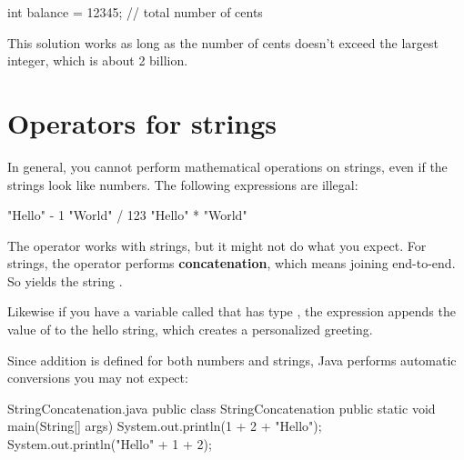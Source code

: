 \begin{code}
int balance = 12345;      // total number of cents
\end{code}


This solution works as long as the number of cents doesn't exceed the largest integer, which is about 2 billion.


\section{Operators for strings}


In general, you cannot perform mathematical operations on strings, even if the strings look like numbers.
The following expressions are illegal:

\begin{code}
"Hello" - 1     "World" / 123     "Hello" * "World"
\end{code}


The \java{+} operator works with strings, but it might not do what you expect.
For strings, the \java{+} operator performs {\bf concatenation}, which means joining end-to-end.
So  yields the string .

Likewise if you have a variable called  that has type , the expression  appends the value of  to the hello string, which creates a personalized greeting.

Since addition is defined for both numbers and strings, Java performs automatic conversions you may not expect:

\begin{trinket}[195]{StringConcatenation.java}
public class StringConcatenation {
    public static void main(String[] args) {
       System.out.println(1 + 2 + "Hello");
       System.out.println("Hello" + 1 + 2);
    }
}
\end{trinket}
%


